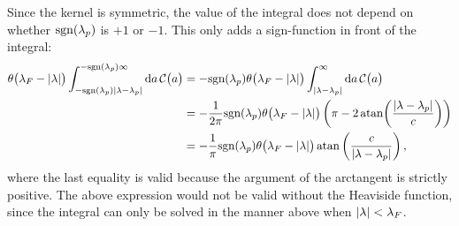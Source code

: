 \documentclass[11pt, a4paper]{report} %
\begin{document}
Since the kernel is symmetric,  the value of the integral does not depend on whether \(\mathrm{sgn}\qty(\lambda_p)\) is \(+1\) or \(-1\).
This only adds a sign-function in front of the integral:
\begin{align}
	\theta\qty\big(\lambda_F - \abs{\lambda}) \int_{-\textrm{sgn}\qty(\lambda_p)\abs{\lambda-\lambda_p}}^{ - \textrm{sgn}\qty(\lambda_p)\infty} \dd a\,\mathcal{C}\qty\big(a) &= - \textrm{sgn}\qty(\lambda_p) \theta\qty\big(\lambda_F - \abs{\lambda}) \int_{\abs{\lambda-\lambda_p}}^{\infty} \dd a\,\mathcal{C}\qty\big(a)\\
	&= - \frac{1}{2\pi} \textrm{sgn}\qty(\lambda_p) \theta\qty\big(\lambda_F - \abs{\lambda})  \left( \pi - 2\atan(\frac{\abs{\lambda - \lambda_p}}{c})\right)\label{eq:dpdeltanonsimplified}\\
	&= - \frac{1}{\pi} \textrm{sgn}\qty(\lambda_p) \theta\qty\big(\lambda_F - \abs{\lambda})  \atan\left(\frac{c}{\abs{\lambda-\lambda_p}}\right),
\end{align}
where the last equality is valid because the argument of the arctangent is strictly positive.
The above expression would not be valid without the Heaviside function, since the integral can only be solved in the manner above when \(\abs{\lambda}< \lambda_F\).
\end{document}
